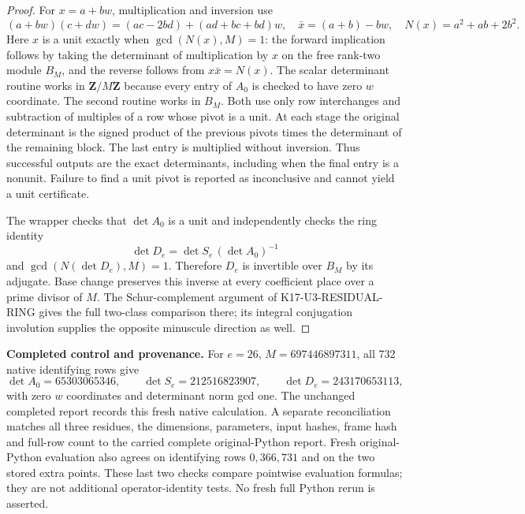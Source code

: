 \documentclass[11pt,a4paper]{article}
\theoremstyle{definition}
\renewcommand{\paragraph}[1]{\par\smallskip\noindent\textbf{#1}\quad\ignorespaces}
\begin{document}
\begin{proof}
For $x=a+bw$, multiplication and inversion use
\[
 (a+bw)(c+dw)=(ac-2bd)+(ad+bc+bd)w,
 \quad \bar x=(a+b)-bw,
 \quad N(x)=a^2+ab+2b^2.
\]
Here $x$ is a unit exactly when $\gcd(N(x),M)=1$: the forward
implication follows by taking the determinant of multiplication
by $x$ on the free rank-two module $B_M$, and the reverse follows
from $x\bar x=N(x)$.  The scalar determinant routine works in
$\mathbf Z/M\mathbf Z$ because every entry of $A_0$ is checked
to have zero $w$ coordinate.  The second routine works in $B_M$.
Both use only row interchanges and subtraction of multiples of
a row whose pivot is a unit.  At each stage the original
determinant is the signed product of the previous pivots times
the determinant of the remaining block.  The last entry is
multiplied without inversion.  Thus successful outputs are the
exact determinants, including when the final entry is a nonunit.
Failure to find a unit pivot is reported as inconclusive and
cannot yield a unit certificate.

The wrapper checks that $\det A_0$ is a unit and independently
checks the ring identity
\[
 \det D_e=\det S_e\,(\det A_0)^{-1}
\]
and $\gcd(N(\det D_e),M)=1$.  Therefore $D_e$ is invertible
over $B_M$ by its adjugate.  Base change preserves this inverse
at every coefficient place over a prime divisor of $M$.
The Schur-complement argument of K17-U3-RESIDUAL-RING gives the
full two-class comparison there; its integral conjugation
involution supplies the opposite minuscule direction as well.
\end{proof}

\paragraph{Completed control and provenance.}
For $e=26$, $M=697446897311$, all 732 native identifying rows
give
\[
 \det A_0=65303065346,\qquad
 \det S_e=212516823907,\qquad
 \det D_e=243170653113,
\]
with zero $w$ coordinates and determinant norm gcd one.
The unchanged completed report
 records this fresh
native calculation.  A separate reconciliation
 matches all three
residues, the dimensions, parameters, input hashes, frame hash
and full-row count to the carried complete original-Python
 report.
Fresh original-Python evaluation also agrees on identifying
rows $0,366,731$ and on the two stored extra points.  These
last two checks compare pointwise evaluation formulas; they
are not additional operator-identity tests.  No fresh full
Python rerun is asserted.
\end{document}

